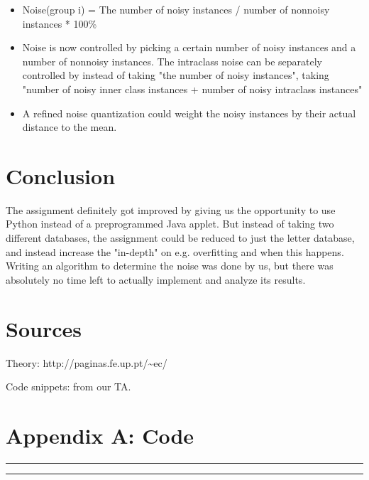 \documentclass[	DIV=calc,%
				paper=a4,%
				fontsize=11pt,%
				twocolumn]{scrartcl}	 %
\newcommand{\HorRule}{\color{brsublue}%
					 \rule{\linewidth}{1pt}%
					 \color{black}
					 }
\begin{document}
\begin{itemize}
	\item Noise(group i) = The number of noisy instances / number of nonnoisy instances * 100\% 
	\item Noise is now controlled by picking a certain number of noisy instances and a number of nonnoisy instances. The intraclass noise can be separately controlled by instead of taking "the number of noisy instances", taking "number of noisy inner class instances + number of noisy intraclass instances"
	\item A refined noise quantization could weight the noisy instances by their actual distance to the mean.
\end{itemize}
	 
\vfill

\section*{Conclusion}

The assignment definitely got improved by giving us the opportunity to use Python instead of a preprogrammed Java applet. But instead of taking two different databases, the assignment could be reduced to just the letter database, and instead increase the "in-depth" on e.g. overfitting and when this happens. Writing an algorithm to determine the noise was done by us, but there was absolutely no time left to actually implement and analyze its results. 

\section*{Sources}

Theory: http://paginas.fe.up.pt/\textasciitilde ec/

Code snippets: from our TA. 

\newpage

\onecolumn
\section*{Appendix A: Code}

\HorRule



\HorRule


\end{document}
